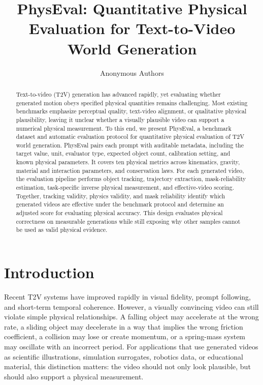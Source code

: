 \documentclass{article}
\title{PhysEval: Quantitative Physical Evaluation for Text-to-Video World Generation}
\author{Anonymous Authors}
\newcommand{\bench}{PhysEval}
\begin{document}
\maketitle

\begin{abstract}
Text-to-video (T2V) generation has advanced rapidly, yet evaluating whether generated motion obeys specified physical quantities remains challenging.
Most existing benchmarks emphasize perceptual quality, text-video alignment, or qualitative physical plausibility, leaving it unclear whether a visually plausible video can support a numerical physical measurement.
To this end, we present \bench{}, a benchmark dataset and automatic evaluation protocol for quantitative physical evaluation of T2V world generation.
\bench{} pairs each prompt with auditable metadata, including the target value, unit, evaluator type, expected object count, calibration setting, and known physical parameters.
It covers ten physical metrics across kinematics, gravity, material and interaction parameters, and conservation laws.
For each generated video, the evaluation pipeline performs object tracking, trajectory extraction, mask-reliability estimation, task-specific inverse physical measurement, and effective-video scoring.
Together, tracking validity, physics validity, and mask reliability identify which generated videos are effective under the benchmark protocol and determine an adjusted score for evaluating physical accuracy.
This design evaluates physical correctness on measurable generations while still exposing why other samples cannot be used as valid physical evidence.
\end{abstract}

\section{Introduction}

Recent T2V systems have improved rapidly in visual fidelity, prompt following, and short-term temporal coherence.
However, a visually convincing video can still violate simple physical relationships.
A falling object may accelerate at the wrong rate, a sliding object may decelerate in a way that implies the wrong friction coefficient, a collision may lose or create momentum, or a spring-mass system may oscillate with an incorrect period.
For applications that use generated videos as scientific illustrations, simulation surrogates, robotics data, or educational material, this distinction matters: the video should not only look plausible, but should also support a physical measurement.
\end{document}
